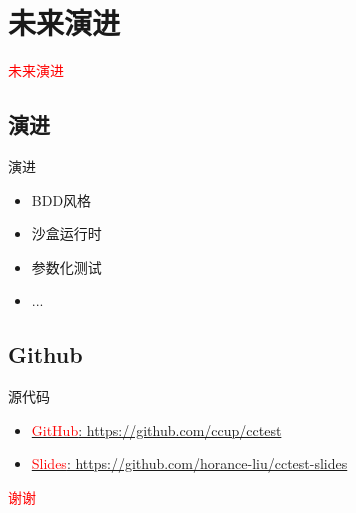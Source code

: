 \section{未来演进}
\label{sec:evolution}

\begin{frame}
  \begin{center}
    \Huge{\textcolor{red}{未来演进}}
  \end{center}
\end{frame}

\subsection{演进}

\begin{frame}{演进}
    \begin{itemize}
      \item BDD风格
      \item 沙盒运行时
      \item 参数化测试
      \item ...
    \end{itemize}
\end{frame}

\subsection{Github}

\begin{frame}{源代码}
    \begin{itemize}
    \item \href{https://github.com/ccup/cctest}{\textcolor{red}{GitHub}: https://github.com/ccup/cctest}
    \item \href{https://github.com/horance-liu/cctest-slides}{\textcolor{red}{Slides}: https://github.com/horance-liu/cctest-slides}    
    \end{itemize}
\end{frame}

\begin{frame}
  \begin{center}
    \Huge{\textcolor{red}{谢谢}}
  \end{center}
\end{frame}